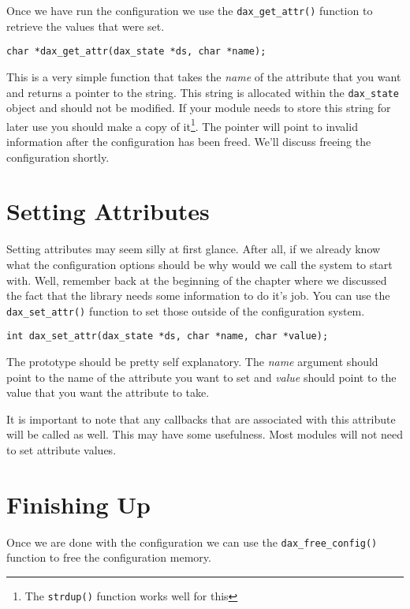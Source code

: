 Once we have run the configuration we use the
\verb|dax_get_attr()| function to retrieve the
values that were set.

\begin{verbatim}
char *dax_get_attr(dax_state *ds, char *name);
\end{verbatim}

This is a very simple function that takes the \textit{name} of the attribute
that you want and returns a pointer to the string.  This string is allocated
within the \verb|dax_state| object and should not be modified.  If your module
needs to store this string for later use you should make a copy of
it\footnote{The \texttt{strdup()} function works well for this}.  The pointer
will point to invalid information after the configuration has been freed.  We'll
discuss freeing the configuration shortly.

\section{Setting Attributes}

Setting attributes may seem silly at first glance.  After all, if we already
know what the configuration options should be why would we call the system to
start with.  Well, remember back at the beginning of the chapter where we
discussed the fact that the library needs some information to do it's job.  You
can use the \verb|dax_set_attr()| function to
set those outside of the configuration system.

\begin{verbatim}
int dax_set_attr(dax_state *ds, char *name, char *value);
\end{verbatim}

The prototype should be pretty self explanatory.  The \textit{name} argument
should point to the name of the attribute you want to set and \textit{value}
should point to the value that you want the attribute to take.

It is important to note that any callbacks that are associated with this
attribute will be called as well.  This may have some usefulness.  Most modules
will not need to set attribute values.

\section{Finishing Up}

Once we are done with the configuration we can use the
\verb|dax_free_config()| function to free
the configuration memory.


